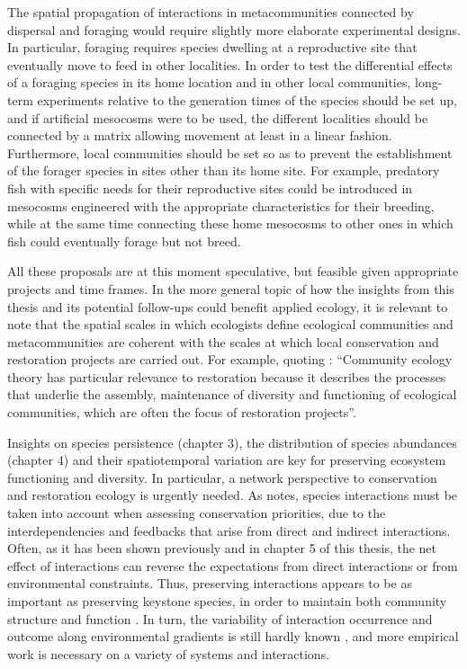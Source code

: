 The spatial propagation of interactions in metacommunities connected by dispersal and foraging would require slightly more elaborate experimental designs. In particular, foraging requires species dwelling at a reproductive site that eventually move to feed in other localities. In order to test the differential effects of a foraging species in its home location and in other local communities, long-term experiments relative to the generation times of the species should be set up, and if artificial mesocosms were to be used, the different localities should be connected by a matrix allowing movement at least in a linear fashion. Furthermore, local communities should be set so as to prevent the establishment of the forager species in sites other than its home site. For example, predatory fish with specific needs for their reproductive sites could be introduced in mesocosms engineered with the appropriate characteristics for their breeding, while at the same time connecting these home mesocosms to other ones in which fish could eventually forage but not breed.

All these proposals are at this moment speculative, but feasible given appropriate projects and time frames. In the more general topic of how the insights from this thesis and its potential follow-ups could benefit applied ecology, it is relevant to note that the spatial scales in which ecologists define ecological communities and metacommunities are coherent with the scales at which local conservation and restoration projects are carried out. For example, quoting \cite{Wainwright2017}: ``Community ecology theory has particular relevance to restoration because it describes the processes that underlie the assembly, maintenance of diversity and functioning of ecological communities, which are often the focus of restoration projects''.

Insights on species persistence (chapter 3), the distribution of species abundances (chapter 4) and their spatiotemporal variation are key for preserving ecosystem functioning and diversity. In particular, a network perspective to conservation and restoration ecology is urgently needed. As \cite{Harvey2017} notes, species interactions must be taken into account when assessing conservation priorities, due to the interdependencies and feedbacks that arise from direct and indirect interactions. Often, as it has been shown previously \citep{Menge1995,Suttle2007,Montoya2009a} and in chapter 5 of this thesis, the net effect of interactions can reverse the expectations from direct interactions or from environmental constraints. Thus, preserving interactions appears to be as important as preserving keystone species, in order to maintain both community structure and function \citep{Wang2018}. In turn, the variability of interaction occurrence and outcome along environmental gradients is still hardly known \citep{Poisot2017}, and more empirical work is necessary on a variety of systems and interactions.

